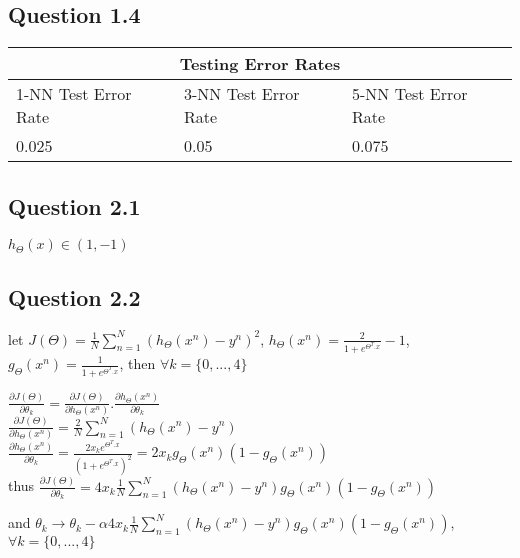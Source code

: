 \documentclass[10pt]{article}
\begin{document}
\bigskip
\subsection*{Question 1.4}
\begin{tabular}{ 
|p{3cm}||p{3cm}|p{3cm}|  }
 \hline
 \multicolumn{3}{|c|}{Testing Error Rates} \\
 \hline
 
 1-NN Test Error Rate & 3-NN Test Error Rate & 5-NN Test Error Rate\\
 \hline
 0.025&0.05&0.075\\
 \hline
 
\end{tabular}

\bigskip

\subsection*{Question 2.1}
$ h_{\Theta}(x) \in (1,-1)$

\subsection*{Question 2.2}
let $J(\Theta) = \frac{1}{N}\sum_{n = 1}^{N} (h_{\Theta}(x^{n}) - y^{n})^{2}$,\quad
$ h_{\Theta}(x^{n}) = \frac{2}{1 + e^{\Theta^{T}.x}} - 1 $,\quad
$ g_{\Theta}(x^{n}) = \frac{1}{1 + e^{\Theta^{T}.x}} $,\quad
then $\forall k = \{0, ..., 4\}$ \\ \medskip

$\frac{\partial J(\Theta)}{\partial \theta_{k}} = \frac{\partial J(\Theta)}{\partial h_{\Theta}(x^{n})} . \frac{\partial h_{\Theta}(x^{n})}{\partial \theta_{k}}$\\
$\frac{\partial J(\Theta)}{\partial h_{\Theta}(x^{n})} = \frac{2}{N}\sum_{n = 1}^{N} (h_{\Theta}(x^{n}) - y^{n})$ \\
$\frac{\partial h_{\Theta}(x^{n})}{\partial \theta_{k}} = \frac{2 x_{k} e^{\Theta^{T}.x}}{(1 + e^{\Theta^{T}.x})^{2}} = 2 x_{k} g_{\Theta}(x^{n}) (1 - g_{\Theta}(x^{n}))$\\
thus $\frac{\partial J(\Theta)}{\partial \theta_{k}} = 4 x_{k} \frac{1}{N}\sum_{n = 1}^{N} (h_{\Theta}(x^{n}) - y^{n}) g_{\Theta}(x^{n}) (1 - g_{\Theta}(x^{n}))$ \\ \bigskip

and $\theta_{k} \to \theta_{k} - \alpha 4 x_{k} \frac{1}{N}\sum_{n = 1}^{N} (h_{\Theta}(x^{n}) - y^{n}) g_{\Theta}(x^{n}) (1 - g_{\Theta}(x^{n}))$, $\forall k = \{0, ..., 4\}$
\end{document}

